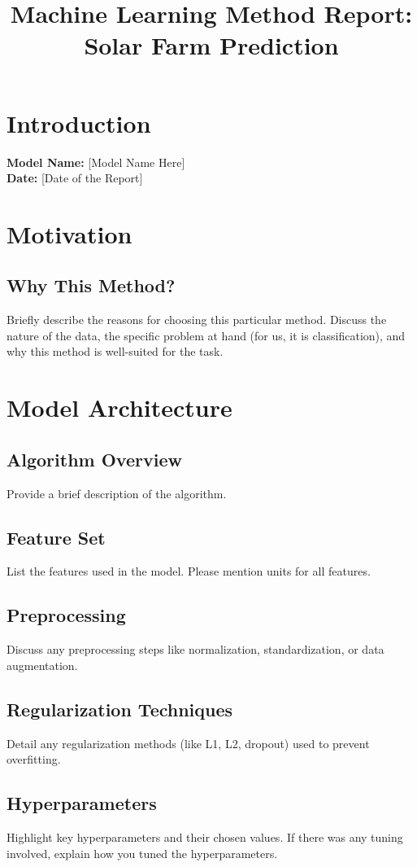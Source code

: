 \documentclass[review,onefignum,onetabnum,twoside]{siamart220329}
\title{Machine Learning Method Report: Solar Farm Prediction}
\date{}
\begin{document}
\maketitle

\section{Introduction}
\textbf{Model Name:} [Model Name Here] \\
\textbf{Date:} [Date of the Report]

\section{Motivation}
\subsection{Why This Method?}
Briefly describe the reasons for choosing this particular method. Discuss the nature of the data, the specific problem at hand (for us, it is classification), and why this method is well-suited for the task.

\section{Model Architecture}
\subsection{Algorithm Overview}
Provide a brief description of the algorithm.
\subsection{Feature Set}
List the features used in the model. Please mention units for all features. 
\subsection{Preprocessing}
Discuss any preprocessing steps like normalization, standardization, or data augmentation.
\subsection{Regularization Techniques}
Detail any regularization methods (like L1, L2, dropout) used to prevent overfitting.
\subsection{Hyperparameters}
Highlight key hyperparameters and their chosen values. If there was any tuning involved, explain how you tuned the hyperparameters. 
\end{document}
